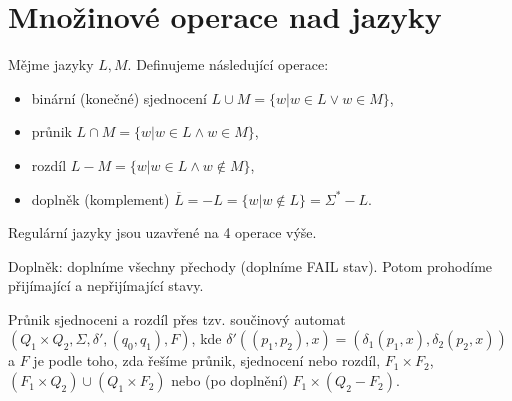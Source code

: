 \documentclass[12pt]{article}                   %
\begin{document}
\section{Množinové operace nad jazyky}
    \begin{definice}
        Mějme jazyky $L, M$. Definujeme následující operace:

        \begin{itemize}
            \item binární (konečné) sjednocení $L \cup M = \{w|w \in L \lor w \in M\}$,
            \item průnik $L \cap M = \{w|w \in L \land w \in M\}$,
            \item rozdíl $L - M = \{w | w \in L \land w \notin M\}$,
            \item doplněk (komplement) $\overline{L} = -L = \{w|w\notin L\} = \Sigma^* - L$.
        \end{itemize}
    \end{definice}

    \begin{veta}
        Regulární jazyky jsou uzavřené na 4 operace výše.

        \begin{dukazin}
            Doplněk: doplníme všechny přechody (doplníme FAIL stav). Potom prohodíme přijímající a nepřijímající stavy.

            Průnik sjednoceni a rozdíl přes tzv. součinový automat $(Q_1 \times Q_2, \Sigma, \delta', (q_0, q_1), F)$, kde $\delta'((p_1, p_2), x) = (\delta_1(p_1, x), \delta_2(p_2, x))$ a $F$ je podle toho, zda řešíme průnik, sjednocení nebo rozdíl, $F_1 \times F_2$, $(F_1\times Q_2)\cup(Q_1 \times F_2)$ nebo (po doplnění) $F_1 \times (Q_2 - F_2)$.
        \end{dukazin}
    \end{veta}
\end{document}
